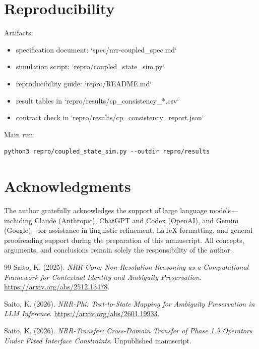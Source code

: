 \documentclass[11pt,a4paper]{article}
\begin{document}
\section{Reproducibility}
Artifacts:
\begin{itemize}
  \item specification document: `spec/nrr-coupled\_spec.md`
  \item simulation script: `repro/coupled\_state\_sim.py`
  \item reproducibility guide: `repro/README.md`
  \item result tables in `repro/results/cp\_consistency\_*.csv`
  \item contract check in `repro/results/cp\_consistency\_report.json`
\end{itemize}

Main run:
\begin{lstlisting}
python3 repro/coupled_state_sim.py --outdir repro/results
\end{lstlisting}

\section*{Acknowledgments}

The author gratefully acknowledges the support of large language
models---including Claude (Anthropic), ChatGPT and Codex (OpenAI), and Gemini (Google)---for assistance in linguistic refinement,
LaTeX formatting, and general proofreading support during the
preparation of this manuscript.
All concepts, arguments, and conclusions remain solely the
responsibility of the author.

\begin{thebibliography}{99}
Saito, K. (2025).
\textit{NRR-Core: Non-Resolution Reasoning as a Computational Framework for Contextual Identity and Ambiguity Preservation}.
\url{https://arxiv.org/abs/2512.13478}.

Saito, K. (2026).
\textit{NRR-Phi: Text-to-State Mapping for Ambiguity Preservation in LLM Inference}.
\url{https://arxiv.org/abs/2601.19933}.

Saito, K. (2026).
\textit{NRR-Transfer: Cross-Domain Transfer of Phase 1.5 Operators Under Fixed Interface Constraints}.
Unpublished manuscript.
\end{thebibliography}
\end{document}
